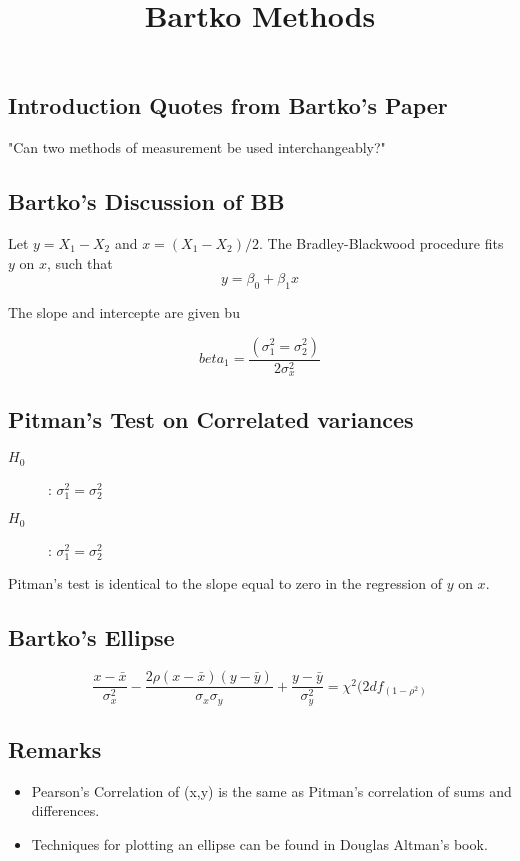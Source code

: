 

\title{Bartko Methods}
\subsection*{Introduction Quotes from Bartko's Paper}
"Can two methods of measurement be used interchangeably?"




\subsection*{Bartko's Discussion of BB}

Let $y = X_1 - X_2$ and $x= (X_1 - X_2)/2$.
The Bradley-Blackwood procedure fits $y$ on $x$, such that
\[ y = \beta_0 + \beta_1x \]

The slope and intercepte are given bu

\[beta_1 =  \frac{(\sigma^2_1 = \sigma^2_2)}{2\sigma^2_x}\]
\subsection*{Pitman's Test on Correlated variances}
\begin{description}
	\item[$H_0$] : $\sigma^2_1 = \sigma^2_2$
	\item[$H_0$] : $\sigma^2_1 = \sigma^2_2$
\end{description}


Pitman's test is identical to the slope equal to zero in the regression of $y$ on $x$.




\subsection*{Bartko's Ellipse}

\[ \frac{x - \bar{x}}{\sigma^2_x} - \frac{2\rho(x - \bar{x})(y - \bar{y})}{\sigma_x \sigma_y} + \frac{y - \bar{y}}{\sigma^2_y} = \chi^2(2df_(1-\rho^2) \]




\subsection*{Remarks}
\begin{itemize}
\item Pearson's Correlation of (x,y) is the same as Pitman's correlation of sums and differences.

\item Techniques for plotting an ellipse can be found in Douglas Altman's book.
\end{itemize}



